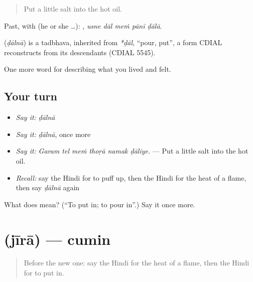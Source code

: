 \begin{quote}
Put a little salt into the hot oil.
\end{quote}

Past, with  (he or she …):     , \emph{usne dāl meṁ pānī ḍālā}.

\begin{cousinweb}
\textbf{} (\emph{ḍālnā}) is a tadbhava, inherited from \emph{*ḍāl}, \textquotedblleft{}pour, put\textquotedblright{}, a form CDIAL reconstructs from its descendants (CDIAL 5545).
\end{cousinweb}

\begin{grammarlens}[title={What you've built}]
One more word for describing what you lived and felt.
\end{grammarlens}

\subsection*{Your turn}
\begin{itemize}
\raggedright
  \item \emph{Say it:} \emph{ḍālnā}
  \item \emph{Say it:} \emph{ḍālnā}, once more
  \item \emph{Say it:} \emph{Garam tel meṁ thoṛā namak ḍāliye.} — Put a little salt into the hot oil.
  \item \emph{Recall:} say the Hindi for to puff up, then the Hindi for the heat of a flame, then say \emph{ḍālnā} again
\end{itemize}

\begin{tcolorbox}[breakable,colback=teal!4,colframe=teal!35!black,title={Before you move on}]
What does  mean? (\textquotedblleft{}To put in; to pour in\textquotedblright{}.) Say it once more.
\end{tcolorbox}
\section[\texorpdfstring{\hi{जीरा} (jīrā)}{जीरा (jīrā)}]{ (jīrā) — cumin}

\label{lesson:HI-C521-jira}



\begin{quote}
Before the new one: say the Hindi for the heat of a flame, then the Hindi for to put in.
\end{quote}

